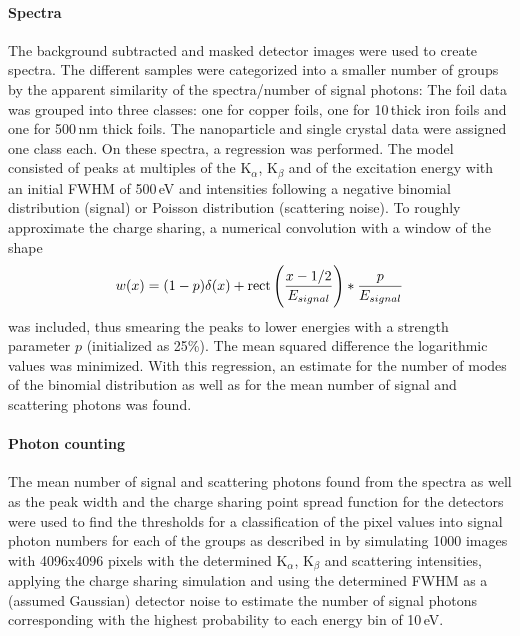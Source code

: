 \paragraph{Spectra}
The background subtracted and masked detector images were used to create spectra. The different samples were categorized into a smaller number of groups by the apparent similarity of the spectra/number of signal photons: The foil  data was grouped into three classes: one for copper foils, one for 10\,\micrometer thick iron foils and one for 500\,nm thick foils. The nanoparticle and single crystal data were assigned one class each.
On these spectra, a regression was performed.  The model consisted of peaks at multiples of the K$_\alpha$, K$_\beta$ and of the excitation energy with an initial FWHM of 500\,eV and intensities following a negative binomial distribution (signal) or Poisson distribution (scattering noise). To roughly approximate the charge sharing, a numerical convolution with a  window of the shape
\begin{equation}
	w (x)= (1-p)\delta(x)+\operatorname{rect}\left(\frac{x-1/2}{E_{signal}}\right)*\frac{p}{E_{signal}}
\end{equation}
was included, thus smearing the peaks to lower energies with a strength parameter $p$ (initialized as 25\%). The mean squared difference the logarithmic values was minimized. With this regression, an estimate for the number of modes of the binomial distribution as well as for the mean number of signal and scattering photons was found.


\paragraph{Photon counting}
The mean number of signal and scattering photons found from the spectra as well as the peak width and the charge sharing point spread function for the detectors were used to find the thresholds for a classification of the pixel values into signal photon numbers for each of the groups as described in  by simulating 1000 images with 4096x4096 pixels with the determined K$_\alpha$, K$_\beta$ and scattering intensities, applying the charge sharing simulation and using the determined FWHM as a (assumed Gaussian) detector noise to estimate the number of signal photons corresponding with the highest probability to each energy bin of 10\,eV. 


